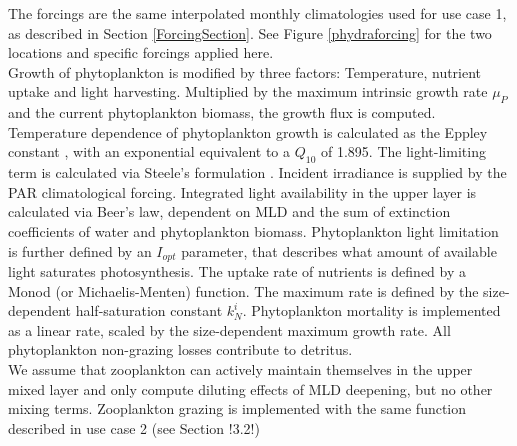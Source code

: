 \documentclass[template.tex]{subfiles}
\begin{document}
The forcings are the same interpolated monthly climatologies used for use case 1, as described in Section \ref{ForcingSection}. See Figure \ref{phydraforcing} for the two locations and specific forcings applied here.\\

Growth of phytoplankton is modified by three factors: Temperature, nutrient uptake and light harvesting. Multiplied by the maximum intrinsic growth rate $\mu_P$ and the current phytoplankton biomass, the growth flux is computed. Temperature dependence of phytoplankton growth is calculated as the Eppley constant \citep{Eppley1972TemperatureSea}, with an exponential equivalent to a $Q_{10}$ of 1.895.
The light-limiting term is calculated via Steele's formulation \citep{Steele1962EnvironmentalSea}. Incident irradiance is supplied by the PAR climatological forcing. Integrated light availability in the upper layer is calculated via Beer's law, dependent on MLD and the sum of extinction coefficients of water and phytoplankton biomass. Phytoplankton light limitation is further defined by an $I_{opt}$ parameter, that describes what amount of available light saturates photosynthesis.
The uptake rate of nutrients is defined by a Monod (or Michaelis-Menten) function. The maximum rate is defined by the size-dependent half-saturation constant $k^i_N$. 
Phytoplankton mortality is implemented as a linear rate, scaled by the size-dependent maximum growth rate. 
All phytoplankton non-grazing losses contribute to detritus.\\

We assume that zooplankton can actively maintain themselves in the upper mixed layer and only compute diluting effects of MLD deepening, but no other mixing terms.
Zooplankton grazing is implemented with the same function described in use case 2 (see Section !3.2!) 
\end{document}
